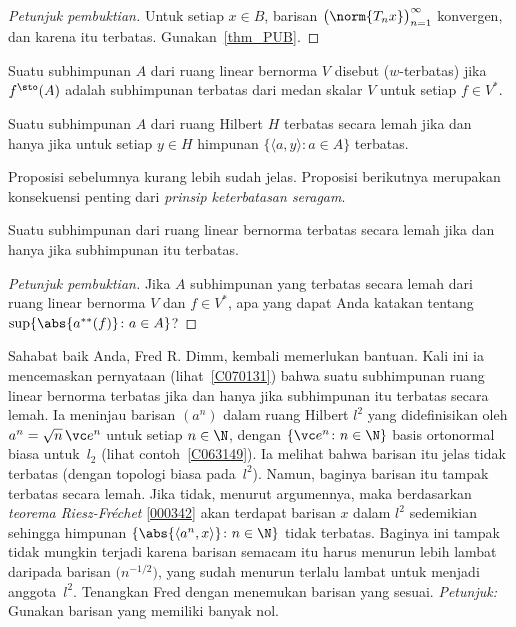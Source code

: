 \begin{proof}[\emph{Petunjuk pembuktian}] Untuk setiap $x \in B$, barisan $\bigl(\norm{T_nx}\bigr)_{n=1}^\infty$
konvergen, dan karena itu terbatas. Gunakan~\ref{thm_PUB}.   \ns
\end{proof}

\begin{defn} Suatu subhimpunan $A$ dari ruang linear bernorma $V$ disebut
 ($w$-terbatas) jika $f^{\sto}(A)$ adalah subhimpunan terbatas dari medan skalar
$V$ untuk setiap $f \in V^*$.
\end{defn}

\begin{prop} Suatu subhimpunan $A$ dari ruang Hilbert $H$ terbatas secara lemah jika dan hanya jika untuk setiap $y \in H$
himpunan $\{\langle a,y \rangle \colon a \in A\}$ terbatas.
\end{prop}

Proposisi sebelumnya kurang lebih sudah jelas. Proposisi berikutnya merupakan konsekuensi penting dari
\emph{prinsip keterbatasan seragam}.

\begin{prop}\label{C070131} Suatu subhimpunan dari ruang linear bernorma terbatas secara lemah jika dan hanya jika
subhimpunan itu terbatas.
\end{prop}

\begin{proof}[\emph{Petunjuk pembuktian}] Jika $A$ subhimpunan yang terbatas secara lemah dari ruang linear bernorma $V$
dan $f \in V^*$, apa yang dapat Anda katakan tentang $\sup\{\abs{a^{**}(f)}\colon a \in A\}$?  \ns
\end{proof}

\begin{exer} Sahabat baik Anda, Fred R. Dimm, kembali memerlukan bantuan. Kali ini ia mencemaskan
pernyataan (lihat~\ref{C070131}) bahwa suatu subhimpunan ruang linear bernorma terbatas jika
dan hanya jika subhimpunan itu terbatas secara lemah. Ia meninjau barisan $(a^n)$ dalam ruang Hilbert
$l^2$ yang didefinisikan oleh $a^n = \sqrt{n}\,\vc e^n$ untuk setiap $n \in \N$, dengan $\{\vc
e^n\colon n \in \N\}$ basis ortonormal biasa untuk~$l_2$ (lihat
contoh~\ref{C063149}). Ia melihat bahwa barisan itu jelas tidak terbatas (dengan topologi biasa
pada~$l^2$). Namun, baginya barisan itu tampak terbatas secara lemah. Jika tidak, menurut argumennya, maka
berdasarkan \emph{teorema Riesz-Fr\'echet} \ref{000342} akan terdapat barisan $x$ dalam
$l^2$ sedemikian sehingga himpunan $\{\abs{\langle a^n,x \rangle}\colon n \in\N\}$ tidak terbatas. Baginya ini tampak
tidak mungkin terjadi karena barisan semacam itu harus menurun lebih lambat daripada
barisan $\bigl(n^{-1/2}\bigr)$, yang sudah menurun terlalu lambat untuk menjadi anggota~$l^2$.
Tenangkan Fred dengan menemukan barisan yang sesuai. \emph{Petunjuk:} Gunakan barisan yang
memiliki banyak nol.
\end{exer}


